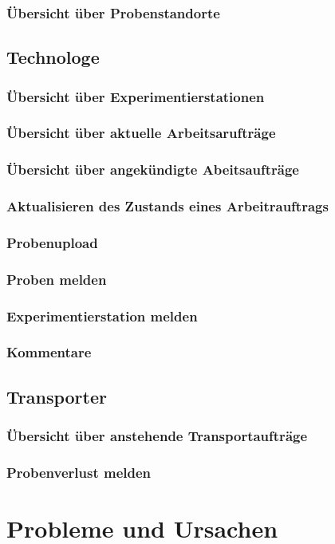\documentclass[enabledeprecatedfontcommands,fontsize=12pt,paper=a4,twoside]{scrartcl}
\begin{document}
\subsubsection{Übersicht über Probenstandorte}
\subsection{Technologe}
\subsubsection{Übersicht über Experimentierstationen}
\subsubsection{Übersicht über aktuelle Arbeitsarufträge}
\subsubsection{Übersicht über angekündigte Abeitsaufträge}
\subsubsection{Aktualisieren des Zustands eines Arbeitrauftrags}
\subsubsection{Probenupload}
\subsubsection{Proben melden}
\subsubsection{Experimentierstation melden}
\subsubsection{Kommentare}
\subsection{Transporter}
\subsubsection{Übersicht über anstehende Transportaufträge}
\subsubsection{Probenverlust melden}


\newpage
\section{Probleme und Ursachen}

\end{document}
